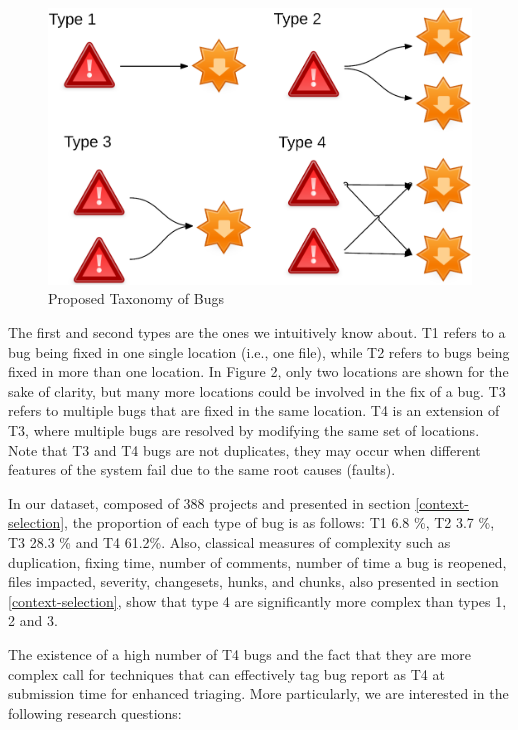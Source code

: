 \documentclass[12pt]{report}
\begin{document}
\begin{figure}[h!]
  \centering
    \includegraphics[scale=0.6]{media/chap9/bug-taxo.png}
    \caption{Proposed Taxonomy of Bugs
    \label{fig:bug-taxo}}
\end{figure}

The first and second types are the ones we intuitively know about. T1
refers to a bug being fixed in one single location (i.e., one file),
while T2 refers to bugs being fixed in more than one location. In Figure
2, only two locations are shown for the sake of clarity, but many more
locations could be involved in the fix of a bug. T3 refers to multiple
bugs that are fixed in the same location. T4 is an extension of T3,
where multiple bugs are resolved by modifying the same set of locations.
Note that T3 and T4 bugs are not duplicates, they may occur when
different features of the system fail due to the same root causes
(faults).

In our dataset, composed of 388 projects and presented in section
\ref{context-selection}, the proportion of each type of bug is as
follows: T1 6.8 \%, T2 3.7 \%, T3 28.3 \% and T4 61.2\%. Also, classical
measures of complexity such as duplication, fixing time, number of
comments, number of time a bug is reopened, files impacted, severity,
changesets, hunks, and chunks, also presented in section
\ref{context-selection}, show that type 4 are significantly more complex
than types 1, 2 and 3.

The existence of a high number of T4 bugs and the fact that they are
more complex call for techniques that can effectively tag bug report as
T4 at submission time for enhanced triaging. More particularly, we are
interested in the following research questions:
\end{document}
